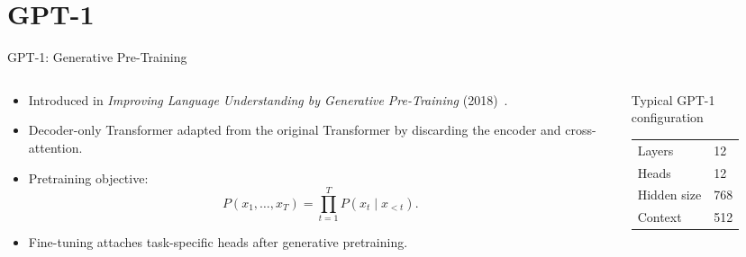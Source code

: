 \documentclass[10pt,aspectratio=169]{beamer}
\begin{document}
\section{GPT-1}

\begin{frame}{GPT-1: Generative Pre-Training}
\begin{columns}[T,totalwidth=\textwidth]
\begin{column}{0.58\textwidth}
\begin{itemize}
  \item Introduced in \emph{Improving Language Understanding by Generative Pre-Training} (2018)~\cite{radford2018gpt}.
  \item Decoder-only Transformer adapted from the original Transformer by discarding the encoder and cross-attention.
  \item Pretraining objective:
  \[
  P(x_1,\ldots,x_T)=\prod_{t=1}^{T} P(x_t\mid x_{<t}).
  \]
  \item Fine-tuning attaches task-specific heads after generative pretraining.
\end{itemize}
\end{column}
\begin{column}{0.38\textwidth}
\begin{block}{Typical GPT-1 configuration}
\centering
\begin{tabular}{@{}ll@{}}
\toprule
Layers & 12 \\
Heads & 12 \\
Hidden size & 768 \\
Context & 512 \\
\bottomrule
\end{tabular}
\end{block}
\end{column}
\end{columns}
\end{frame}
\end{document}
